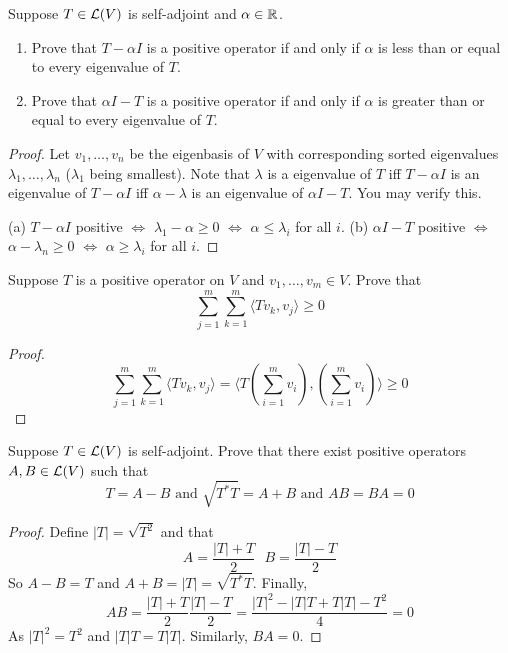 \documentclass{extarticle}
\begin{document}
\begin{problem}{13}
    Suppose \(T \in \mathcal{L}(V)\) is self-adjoint and \(\alpha \in \mathbb{R}\). 
    \begin{enumerate}[label=(\alph*)]
        \item Prove that \(T - \alpha I\) is a positive operator if and only if \(\alpha\) is less 
        than or equal to every eigenvalue of \(T\).
        \item Prove that \(\alpha I - T\) is a positive operator if and only if \(\alpha\) is 
        greater than or equal to every eigenvalue of \(T\).
    \end{enumerate}
\end{problem}

\begin{proof}
Let \(v_1, \ldots, v_n\) be the eigenbasis of \(V\) with corresponding sorted eigenvalues \(\lambda_1, 
\ldots, \lambda_n\) (\(\lambda_1\) being smallest). Note that \(\lambda\) is a eigenvalue of \(T\) iff \(T- \alpha I\) is 
an eigenvalue of \(T - \alpha I\) iff \(\alpha - \lambda\) is an eigenvalue of \(\alpha I - T\). You 
may verify this.

(a) \(T - \alpha I\) positive \(\Longleftrightarrow\) \(\lambda_1 - \alpha \geq 0\) 
\(\Longleftrightarrow\) \(\alpha \leq \lambda_i\) for all \(i\). 
(b) \(\alpha I  -T\) positive \(\Longleftrightarrow\) \(\alpha - \lambda_n \geq 0\) 
\(\Longleftrightarrow\) \(\alpha \geq \lambda_i\) for all \(i\).

\end{proof}


\begin{problem}{14}
    Suppose \(T\) is a positive operator on \(V\) and \(v_1, \ldots, v_m \in V\). Prove that 
    \[\sum_{j=1}^{m} \sum_{k=1}^{m} \langle Tv_k,v_j \rangle \geq 0\]
\end{problem}

\begin{proof}
\[\sum_{j=1}^{m} \sum_{k=1}^{m} \langle Tv_k,v_j \rangle  
= \langle T(\sum_{i=1}^{m} v_i), (\sum_{i=1}^{m} v_i) \rangle \geq 0\]
\end{proof}

\begin{problem}{15}
    Suppose \(T \in \mathcal{L}(V)\) is self-adjoint. Prove that there exist positive operators \(A, B 
    \in \mathcal{L}(V)\) such that 
    \[T = A - B \text{ and } \sqrt{T^* T} = A + B \text{ and } AB = BA = 0\]
\end{problem}

\begin{proof}
Define \(|T| = \sqrt{T^2}\) and that 
\[A = \frac{|T| + T}{2} \ \ \ B = \frac{|T| - T}{2}\]
So \(A - B = T\) and \(A+B = |T| = \sqrt{T^* T}\). Finally, 
\[AB = \frac{|T| + T}{2} \frac{|T| - T}{2} = \frac{|T|^2 - |T|T + T|T| - T^2}{4} = 0\] 
As \(|T|^2 = T^2\) and \(|T|T = T|T|\). Similarly, \(BA = 0\).
\end{proof}
\end{document}

